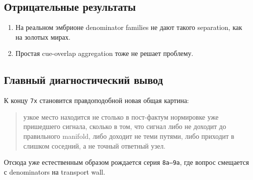 \subsection{Отрицательные результаты}

\begin{enumerate}[leftmargin=2em]
\item На реальном эмбрионе denominator families не дают такого separation, как на
золотых мирах.
\item Простая cue-overlap aggregation тоже не решает проблему.
\end{enumerate}

\subsection{Главный диагностический вывод}

К концу \texttt{7x} становится правдоподобной новая общая картина:

\begin{quote}
узкое место находится не столько в пост-фактум нормировке уже пришедшего
сигнала, сколько в том, что сигнал либо не доходит до правильного manifold,
либо доходит не теми путями, либо приходит в слишком соседний, а не точный
ответный узел.
\end{quote}

Отсюда уже естественным образом рождается серия \texttt{8a--9a}, где вопрос
смещается с denominators на transport wall.
